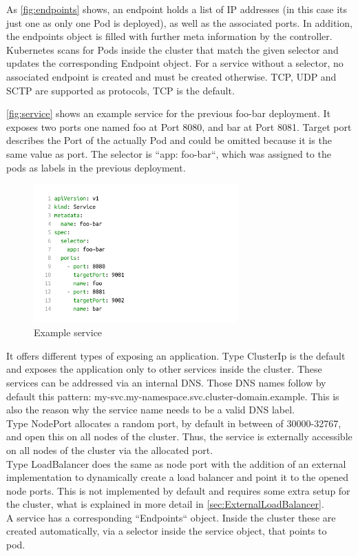 As \autoref{fig:endpoints} shows, an endpoint holds a list of IP addresses (in this case its just one as only one Pod is deployed), as well as the associated ports.
In addition, the endpoints object is filled with further meta information by the controller.
Kubernetes scans for Pods inside the cluster that match the given selector and updates the corresponding Endpoint object.
For a service without a selector, no associated endpoint is created and must be created otherwise.
TCP, UDP and SCTP are supported as protocols, TCP is the default.

\autoref{fig:service} shows an example service for the previous foo-bar deployment.
It exposes two ports one named foo at Port 8080, and bar at Port 8081.
Target port describes the Port of the actually Pod and could be omitted because it is the same value as port.
The selector is ``app: foo-bar``, which was assigned to the pods as labels in the previous deployment.

\begin{figure}[H]
    \centering
    \includegraphics[width=0.7\textwidth, left]{media/02/service}
    \caption{Example service}
    \label{fig:service}
\end{figure}


It offers different types of exposing an application.
Type ClusterIp is the default and exposes the application only to other services inside the cluster.
These services can be addressed via an internal DNS.
Those DNS names follow by default this pattern: my-svc.my-namespace.svc.cluster-domain.example.
This is also the reason why the service name needs to be a valid DNS label.
\\
Type NodePort allocates a random port, by default in between of 30000-32767, and open this on all nodes of the cluster.
Thus, the service is externally accessible on all nodes of the cluster via the allocated port.
\\
Type LoadBalancer does the same as node port with the addition of an external implementation to dynamically create a load balancer and point it to the opened node ports.
This is not implemented by default and requires some extra setup for the cluster, what is explained in more detail in \autoref{sec:ExternalLoadBalancer}.
\\
A service has a corresponding ``Endpoints`` object.
Inside the cluster these are created automatically, via a selector inside the service object, that points to pod.~\cite{KUBERNETES-SERVICE}
